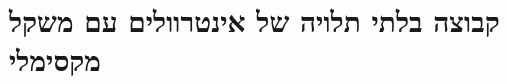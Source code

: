 \documentclass[]{article}
\def\insert#1{}
\begin{document}
\def\lecnum{9}
\def\topcis{
תכנון דינאמי
}


\section*{קבוצה בלתי תלויה של אינטרוולים עם משקל מקסימלי}
\insert{interval}
\end{document}
